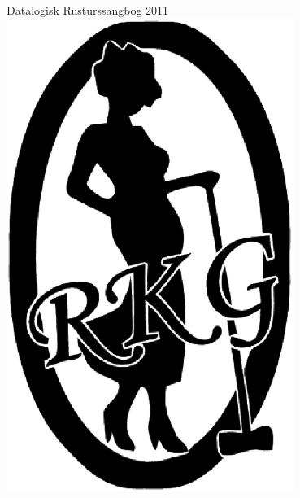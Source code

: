\pagestyle{empty}
\begin{center}
  {\LARGE Datalogisk Rusturssangbog 2011}\\
  \includegraphics[width=0.7\textwidth]{logo.eps}
\end{center}

\newpage


